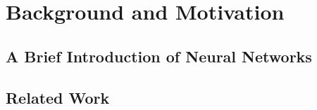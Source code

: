 \chapter{Background and Motivation}
\section{A Brief Introduction of Neural Networks}
\section{Related Work}